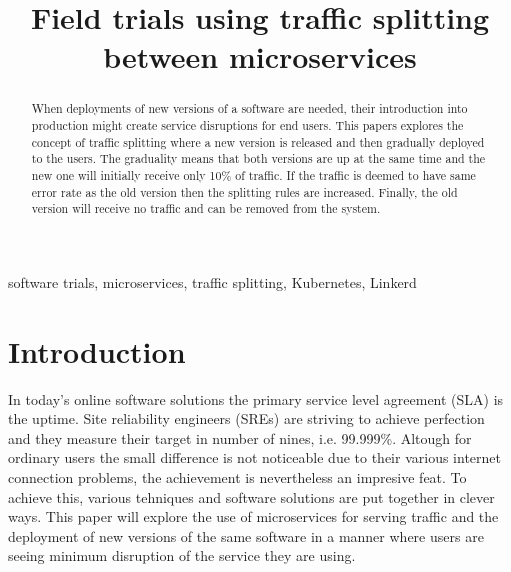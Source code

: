 \documentclass[conference]{IEEEtran}
\begin{document}
\title{Field trials using traffic splitting between microservices}

\author{
    \and
}

\maketitle

\begin{abstract}
    When deployments of new versions of a software are needed, their introduction into production might create service disruptions for end users. This papers explores the concept of traffic splitting where a new version is released and then gradually deployed to the users. The graduality means that both versions are up at the same time and the new one will initially receive only 10\% of traffic. If the traffic is deemed to have same error rate as the old version then the splitting rules are increased. Finally, the old version will receive no traffic and can be removed from the system.
\end{abstract}

\begin{IEEEkeywords}
    software trials, microservices, traffic splitting, Kubernetes, Linkerd
\end{IEEEkeywords}

\section{Introduction}
    In today's online software solutions the primary service level agreement (SLA) is the uptime. Site reliability engineers (SREs) are striving to achieve perfection and they measure their target in number of nines, i.e. 99.999\%. Altough for ordinary users the small difference is not noticeable due to their various internet connection problems, the achievement is nevertheless an impresive feat. To achieve this, various tehniques and software solutions are put together in clever ways. This paper will explore the use of microservices for serving traffic and the deployment of new versions of the same software in a manner where users are seeing minimum disruption of the service they are using.
\end{document}
